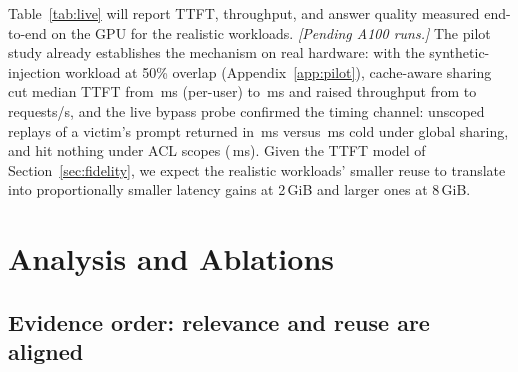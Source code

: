 \documentclass[11pt]{article}
\begin{document}
Table~\ref{tab:live} will report TTFT, throughput, and answer quality measured end-to-end on the GPU for the realistic workloads. \emph{[Pending A100 runs.]} The pilot study already establishes the mechanism on real hardware: with the synthetic-injection workload at 50\% overlap (Appendix~\ref{app:pilot}), cache-aware sharing cut median TTFT from \numliveBoneTTFT\,ms (per-user) to \numliveBsixTTFT\,ms and raised throughput from \numliveBoneRPS{} to \numliveBsixRPS{} requests/s, and the live bypass probe confirmed the timing channel: unscoped replays of a victim's prompt returned in \numprobeBypassUB\,ms versus \numprobeColdUB\,ms cold under global sharing, and hit nothing under ACL scopes (\numprobeBypassBthree\,ms). Given the TTFT model of Section~\ref{sec:fidelity}, we expect the realistic workloads' smaller reuse to translate into proportionally smaller latency gains at 2\,GiB and larger ones at 8\,GiB.

\section{Analysis and Ablations}
\label{sec:analysis}

\subsection{Evidence order: relevance and reuse are aligned}
\label{sec:ordering}

\begin{table}[t]
\centering
\small
\setlength{\tabcolsep}{3pt}
\resizebox{\columnwidth}{!}{}
\caption{Evidence ordering under ACL scopes (mean over three HotpotQA seeds and one MuSiQue seed, 2\,GiB). \emph{Gold mid}: answer-bearing passages in positions $3$ to $n{-}2$; \emph{Top-1 at edge}: highest-ranked passage first or last.}
\label{tab:order}
\end{table}
\end{document}
